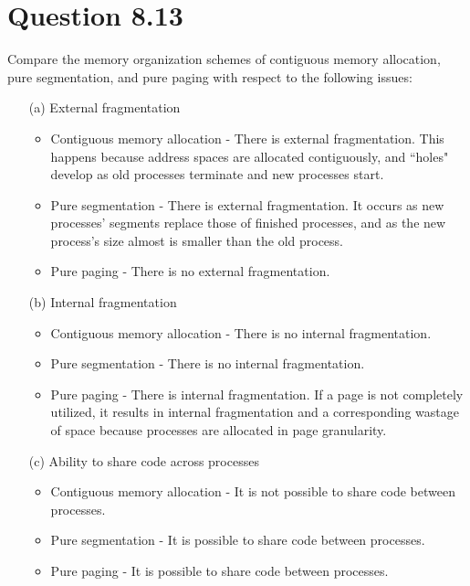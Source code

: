 \documentclass[12pt]{article}
\begin{document}
\section*{Question 8.13}{\color{blue}Compare the memory organization schemes of contiguous memory allocation, pure segmentation, and pure paging with respect to the following issues:
\begin{enumerate}
\item[(a)]External fragmentation {\color{black}
\begin{itemize}
\item Contiguous memory allocation - There is external fragmentation. This happens because address spaces are allocated contiguously, and ``holes" develop as old processes terminate and new processes start.
\item Pure segmentation - There is external fragmentation. It occurs as new processes' segments replace those of finished processes, and as the new process's size almost is smaller than the old process.
\item Pure paging - There is no external fragmentation.
\end{itemize}
}
\item[(b)]Internal fragmentation {\color{black}
\begin{itemize}
\item Contiguous memory allocation - There is no internal fragmentation.
\item Pure segmentation - There is no internal fragmentation.
\item Pure paging - There is internal fragmentation. If a page is not completely utilized, it results in internal fragmentation and a corresponding wastage of space because processes are allocated in page granularity.
\end{itemize}
}
\item[(c)]Ability to share code across processes {\color{black}
\begin{itemize}
\item Contiguous memory allocation - It is not possible to share code between processes.
\item Pure segmentation - It is possible to share code between processes.
\item Pure paging - It is possible to share code between processes.
\end{itemize}
}
\end{enumerate}
}
\end{document}
